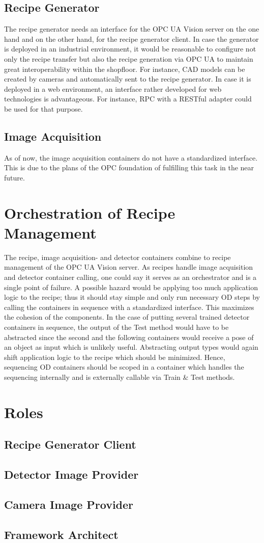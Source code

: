 \subsection{Recipe Generator}
The recipe generator needs an interface for the OPC UA Vision server on the one hand and on the other hand, for the recipe generator client. In case the generator is deployed in an industrial environment, it would be reasonable to configure not only the recipe transfer but also the recipe generation via OPC UA to maintain great interoperability within the shopfloor. For instance, CAD models can be created by cameras and automatically sent to the recipe generator. In case it is deployed in a web environment, an interface rather developed for web technologies is advantageous. For instance, RPC with a RESTful adapter could be used for that purpose.

\subsection{Image Acquisition}
As of now, the image acquisition containers do not have a standardized interface. This is due to the plans of the OPC foundation of fulfilling this task in the near future.

\section{Orchestration of Recipe Management}
The recipe, image acquisition- and  detector containers combine to recipe management of the OPC UA Vision server. As recipes handle image acquisition and detector container calling, one could say it serves as an orchestrator and is a single point of failure. A possible hazard would be applying too much application logic to the recipe; thus it should stay simple and only run necessary OD steps by calling the containers in sequence with a standardized interface. This maximizes the cohesion of the components. In the case of putting several trained detector containers in sequence, the output of the Test method would have to be abstracted since the second and the following containers would receive a pose of an object as input which is unlikely useful. Abstracting output types would again shift application logic to the recipe which should be minimized. Hence, sequencing OD containers should be scoped in a container which handles the sequencing internally and is externally callable via Train \& Test methods.

\section{Roles}
\label{sec:involvedparties}
\subsection{Recipe Generator Client}

\subsection{Detector Image Provider}

\subsection{Camera Image Provider}

\subsection{Framework Architect}

